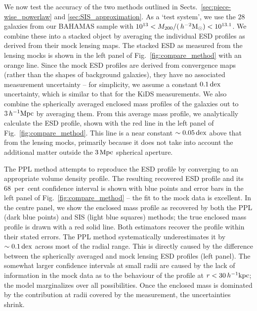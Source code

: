 \documentclass[usenatbib]{mnras}
\newcommand{\hmsun}{\,h^{-2} {\rm M_\odot}}
\newcommand{\hkpc}{\, h^{-1}{\rm{kpc}} }
\newcommand{\hMpc}{\, h^{-1}{\rm{Mpc}} }
\newcommand{\dex}{\, {\rm dex}}
\begin{document}
We now test the accuracy of the two methods outlined in Sects.~\ref{sec:piece-wise_powerlaw} and \ref{sec:SIS_approximation}. As a `test system', we use the $28$ galaxies from our BAHAMAS sample with $10^{13}<M_{200}/(\hmsun)<10^{13.1}$. We combine these into a stacked object by averaging the individual ESD profiles as derived from their mock lensing maps. The stacked ESD as measured from the lensing mocks is shown in the left panel of Fig.~\ref{fig:compare_method} with an orange line. Since the mock ESD profiles are derived from convergence maps (rather than the shapes of background galaxies), they have no associated measurement uncertainty -- for simplicity, we assume a constant $0.1 \dex$ uncertainty, which is similar to that for the KiDS measurements. We also combine the spherically averaged enclosed mass profiles of the galaxies out to $3 \hMpc$ by averaging them. From this average mass profile, we analytically calculate the ESD profile, shown with the red line in the left panel of Fig.~\ref{fig:compare_method}. This line is a near constant $\sim 0.05 \dex$ above that from the lensing mocks, primarily because it does not take into account the additional matter outside the $3\,{\rm Mpc}$ spherical aperture.

The PPL method attempts to reproduce the ESD profile by converging to an appropriate volume density profile. The resulting recovered ESD profile and its 68~per~cent confidence interval is shown with blue points and error bars in the left panel of Fig.~\ref{fig:compare_method} -- the fit to the mock data is excellent. In the centre panel, we show the enclosed mass profile as recovered by both the PPL (dark blue points) and SIS (light blue squares) methods; the true enclosed mass profile is drawn with a red solid line. Both estimators recover the profile within their stated errors. The PPL method systematically underestimates it by $\sim 0.1 \dex$ across most of the radial range. This is directly caused by the difference between the spherically averaged and mock lensing ESD profiles (left panel). The somewhat larger confidence intervals at small radii are caused by the lack of information in the mock data as to the behaviour of the profile at $r < 30 \hkpc$; the model marginalizes over all possibilities. Once the enclosed mass is dominated by the contribution at radii covered by the measurement, the uncertainties shrink.
\end{document}
